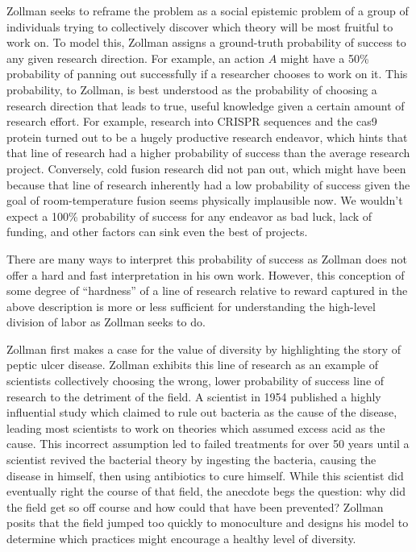Zollman seeks to reframe the problem as a social epistemic problem of a
group of individuals trying to collectively discover which theory will
be most fruitful to work on. To model this, Zollman assigns a
ground-truth probability of success to any given research direction. For
example, an action \(A\) might have a 50\% probability of panning out
successfully if a researcher chooses to work on it. This probability, to
Zollman, is best understood as the probability of choosing a research
direction that leads to true, useful knowledge given a certain amount of
research effort. For example, research into CRISPR sequences and the
cas9 protein turned out to be a hugely productive research endeavor,
which hints that that line of research had a higher probability of
success than the average research project. Conversely, cold fusion
research did not pan out, which might have been because that line of
research inherently had a low probability of success given the goal of
room-temperature fusion seems physically implausible now. We wouldn't
expect a 100\% probability of success for any endeavor as bad luck, lack
of funding, and other factors can sink even the best of projects.

There are many ways to interpret this probability of success as Zollman
does not offer a hard and fast interpretation in his own work. However,
this conception of some degree of ``hardness'' of a line of research
relative to reward captured in the above description is more or less
sufficient for understanding the high-level division of labor as Zollman
seeks to do.

Zollman first makes a case for the value of diversity by highlighting
the story of peptic ulcer disease. Zollman exhibits this line of
research as an example of scientists collectively choosing the wrong,
lower probability of success line of research to the detriment of the
field. A scientist in 1954 published a highly influential study which
claimed to rule out bacteria as the cause of the disease, leading most
scientists to work on theories which assumed excess acid as the cause.
This incorrect assumption led to failed treatments for over 50 years
until a scientist revived the bacterial theory by ingesting the
bacteria, causing the disease in himself, then using antibiotics to cure
himself. While this scientist did eventually right the course of that
field, the anecdote begs the question: why did the field get so off
course and how could that have been prevented? Zollman posits that the
field jumped too quickly to monoculture and designs his model to
determine which practices might encourage a healthy level of diversity.

